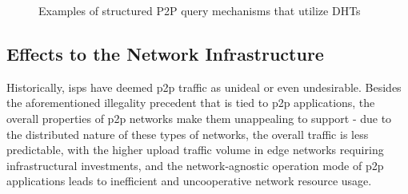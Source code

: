 \begin{figure}%
\centering
{}%
\qquad
{}%
\caption{Examples of structured P2P query mechanisms that utilize DHTs}
\label{fig:dht-usage}
\end{figure}

\subsection{Effects to the Network Infrastructure}

\label{ssec:p2p-effects}

    Historically, \glspl{isp} have deemed \gls{p2p} traffic as unideal or even undesirable.
    Besides the aforementioned illegality precedent that is tied to \gls{p2p} applications, the overall properties of \gls{p2p} networks make them unappealing to support - due to the distributed nature of these types of networks, the overall traffic is less predictable, with the higher upload traffic volume in edge networks requiring infrastructural investments, and the network-agnostic operation mode of \gls{p2p} applications leads to inefficient and uncooperative network resource usage.

